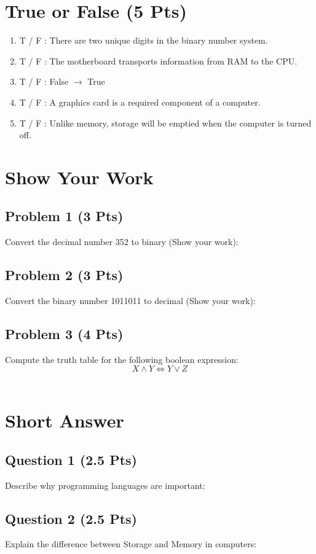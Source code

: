 \documentclass{article}
\begin{document}
\pagestyle{fancy}
\section{True or False (5 Pts)}
\begin{enumerate}
    \item T / F : There are two unique digits in the binary number system.
    \item T / F : The motherboard transports information from RAM to the CPU.
    \item T / F : False $\rightarrow$ True
    \item T / F : A graphics card is a required component of a computer.
    \item T / F : Unlike memory, storage will be emptied when the computer is turned off.
\end{enumerate}

\section{Show Your Work}
\subsection*{Problem 1 (3 Pts)}
Convert the decimal number 352 to binary (Show your work):
\\[3.5in]
\subsection*{Problem 2 (3 Pts)}
Convert the binary number 1011011 to decimal (Show your work):
\newpage
\subsection*{Problem 3 (4 Pts)}
Compute the truth table for the following boolean expression: 
\[
    X \land Y \iff Y \lor Z
\]
~
\\[3.5in]
\section{Short Answer}
\subsection*{Question 1 (2.5 Pts)}
Describe why programming languages are important:

\newpage
\subsection*{Question 2 (2.5 Pts)}
Explain the difference between Storage and Memory in computers:
\end{document}
